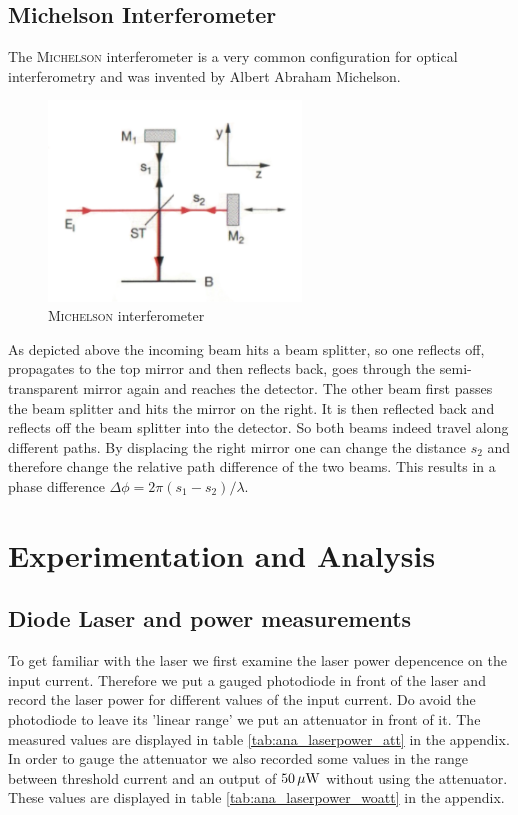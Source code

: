 \documentclass{protokoll_en}
\begin{document}
\subsection{Michelson Interferometer}
The \textsc{Michelson} interferometer is a very common configuration for optical interferometry and was invented by Albert Abraham Michelson. 
\begin{figure}[H]
	\centering
		\includegraphics[width=0.6\textwidth]{graphics/michelson}
	\caption{\textsc{Michelson} interferometer~\cite{demtroed2}}
	\label{fig:michelson}
\end{figure}
As depicted above the incoming beam hits a beam splitter, so one reflects off, propagates to the top mirror and then reflects back, goes through the semi-transparent mirror again and reaches the detector. The other beam first passes the beam splitter and hits the mirror on the right. It is then reflected back and reflects off the beam splitter into the detector. So both beams indeed travel along different paths. By displacing the right mirror one can change the distance $s_2$ and therefore change the relative path difference of the two beams. This results in a phase difference $\Delta \phi = 2\pi (s_1-s_2)/\lambda$.

\section{Experimentation and Analysis}
\subsection{Diode Laser and power measurements}\label{ana_laserpower}
To get familiar with the laser we first examine the laser power depencence on the input current. Therefore we put a gauged photodiode in front of the laser and record the laser power for different values of the input current. Do avoid the photodiode to leave its 'linear range' we put an attenuator in front of it. The measured values are displayed in table \ref{tab:ana_laserpower_att} in the appendix. In order to gauge the attenuator we also recorded some values in the range between threshold current and an output of $\unit[50]{\mu W}$ without using the attenuator. These values are displayed in table \ref{tab:ana_laserpower_woatt} in the appendix.
\end{document}

